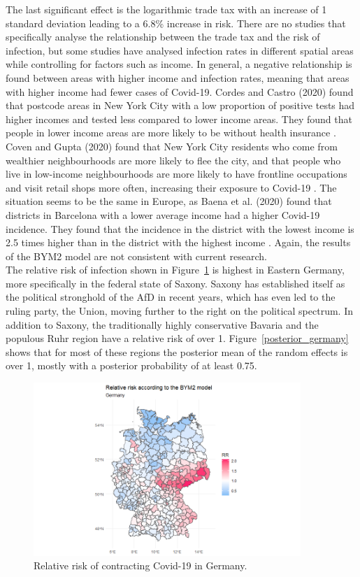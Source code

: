 The last significant effect is the logarithmic trade tax with an increase of 1 standard deviation leading to a 6.8\% increase in risk. There are no studies that specifically analyse the relationship between the trade tax and the risk of infection, but some studies have analysed infection rates in different spatial areas while controlling for factors such as income. In general, a negative relationship is found between areas with higher income and infection rates, meaning that areas with higher income had fewer cases of Covid-19. Cordes and Castro (2020) found that postcode areas in New York City with a low proportion of positive tests had higher incomes and tested less compared to lower income areas. They found that people in lower income areas are more likely to be without health insurance \autocite[][]{cordes2020spatial}. Coven and Gupta (2020) found that New York City residents who come from wealthier neighbourhoods are more likely to flee the city, and that people who live in low-income neighbourhoods are more likely to have frontline occupations and visit retail shops more often, increasing their exposure to Covid-19 \autocite[][]{coven2020disparities}. The situation seems to be the same in Europe, as Baena et al. (2020) found that districts in Barcelona with a lower average income had a higher Covid-19 incidence. They found that the incidence in the district with the lowest income is 2.5 times higher than in the district with the highest income \autocite[][]{baena2020impact}. Again, the results of the BYM2 model are not consistent with current research. \\
The relative risk of infection shown in Figure~\ref{rr_germany} is highest in Eastern Germany, more specifically in the federal state of Saxony. Saxony has established itself as the political stronghold of the AfD in recent years, which has even led to the ruling party, the Union, moving further to the right on the political spectrum. In addition to Saxony, the traditionally highly conservative Bavaria and the populous Ruhr region have a relative risk of over 1. Figure~\ref{posterior_germany} shows that for most of these regions the posterior mean of the random effects is over 1, mostly with a posterior probability of at least 0.75.
\begin{figure}[H]
  \centering
  \includegraphics[width = 0.9\textwidth]{relative_risk_germany.png}
  \caption{Relative risk of contracting Covid-19 in Germany.}
  \label{rr_germany}
\end{figure}

